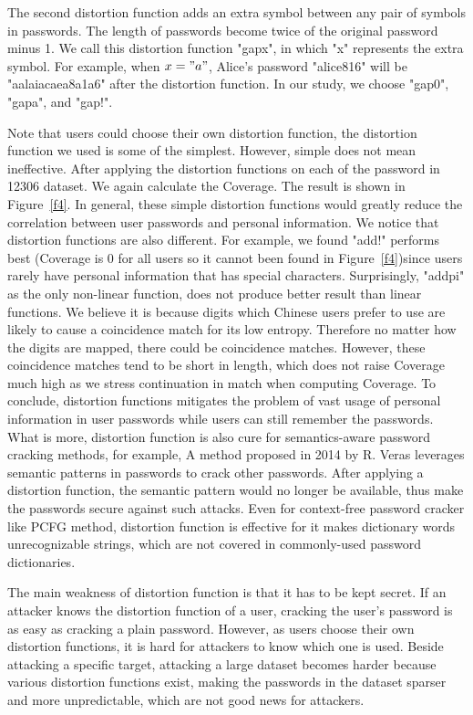 The second distortion function adds an extra symbol between any pair of symbols in passwords. The length of passwords become twice of the original password minus 1. We call this distortion function "gapx", in which "x" represents the extra symbol. For example, when $x = "a"$, Alice's password "alice816" will be "aalaiacaea8a1a6" after the distortion function. In our study, we choose "gap0", "gapa", and "gap!".

Note that users could choose their own distortion function, the distortion function we used is some of the simplest. However, simple does not mean ineffective. After applying the distortion functions on each of the password in 12306 dataset. We again calculate the Coverage. The result is shown in Figure~\ref{f4}. In general, these simple distortion functions would greatly reduce the correlation between user passwords and personal information. We notice that distortion functions are also different. For example, we found "add!" performs best (Coverage is 0 for all users so it cannot been found in Figure~\ref{f4})since users rarely have personal information that has special characters. Surprisingly, "addpi" as the only non-linear function, does not produce better result than linear functions. We believe it is because digits which Chinese users prefer to use are likely to cause a coincidence match for its low entropy. Therefore no matter how the digits are mapped, there could be coincidence matches. However, these coincidence matches tend to be short in length, which does not raise Coverage much high as we stress continuation in match when computing Coverage. To conclude, distortion functions mitigates the problem of vast usage of personal information in user passwords while users can still remember the passwords. What is more, distortion function is also cure for semantics-aware password cracking methods, for example, A method \cite{veras2014semantic} proposed in 2014 by R. Veras leverages semantic patterns in passwords to crack other passwords. After applying a distortion function, the semantic pattern would no longer be available, thus make the passwords secure against such attacks. Even for context-free password cracker like PCFG method, distortion function is effective for it makes dictionary words unrecognizable strings, which are not covered in commonly-used password dictionaries. 

The main weakness of distortion function is that it has to be kept secret. If an attacker knows the distortion function of a user, cracking the user's password is as easy as cracking a plain password. However, as users choose their own distortion functions, it is hard for attackers to know which one is used. Beside attacking a specific target, attacking a large dataset becomes harder because various distortion functions exist, making the passwords in the dataset sparser and more unpredictable, which are not good news for attackers.
 

